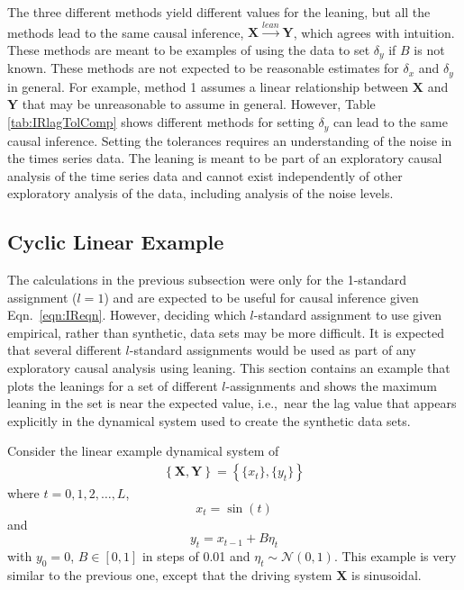 \documentclass[twocolumn,aps,pre,groupedaddress]{revtex4-1}
\begin{document}
The three different methods yield different values for the leaning, but all the methods lead to the same causal inference, $\mathbf{X}\xrightarrow{lean}\mathbf{Y}$, which agrees with intuition.  These methods are meant to be examples of using the data to set $\delta_y$ if $B$ is not known.  These methods are not expected to be reasonable estimates for $\delta_x$ and $\delta_y$ in general.  For example, method 1 assumes a linear relationship between $\mathbf{X}$ and $\mathbf{Y}$ that may be unreasonable to assume in general.  However, Table \ref{tab:IRlagTolComp} shows different methods for setting $\delta_y$ can lead to the same causal inference.  Setting the tolerances requires an understanding of the noise in the times series data.  The leaning is meant to be part of an exploratory causal analysis of the time series data and cannot exist independently of other exploratory analysis of the data, including analysis of the noise levels.  

\subsection{Cyclic Linear Example}
The calculations in the previous subsection were only for the 1-standard assignment ($l=1$) and are expected to be useful for causal inference given Eqn.\ \ref{eqn:IReqn}.  However, deciding which $l$-standard assignment to use given empirical, rather than synthetic, data sets may be more difficult.  It is expected that several different $l$-standard assignments would be used as part of any exploratory causal analysis using leaning.  This section contains an example that plots the leanings for a set of different $l$-assignments and shows the maximum leaning in the set is near the expected value, i.e.,\ near the lag value that appears explicitly in the dynamical system used to create the synthetic data sets. 

Consider the linear example dynamical system of
\begin{eqnarray}
\label{eqn:cyceqn}
\left\{\mathbf{X},\mathbf{Y}\right\} = \left\{\{x_t\},\{y_t\}\right\}
\end{eqnarray}
where $t=0,1,2,\ldots,L$,
\begin{equation*}
x_t = \sin(t)
\end{equation*}
and
\begin{equation*}
y_t = x_{t-1} + B\eta_t
\end{equation*}
with $y_0 = 0$, $B\in[0,1]$ in steps of 0.01 and $\eta_t\sim\mathcal{N}\left(0,1\right)$.  This example is very similar to the previous one, except that the driving system $\mathbf{X}$ is sinusoidal.
\end{document}

